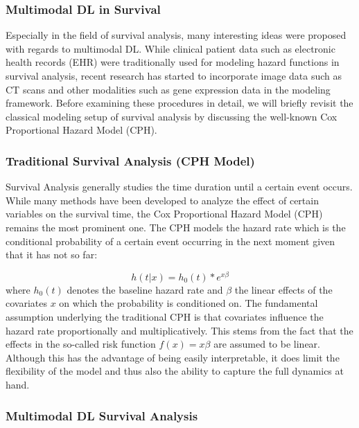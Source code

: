 \documentclass[
]{krantz}
\begin{document}
\hypertarget{multimodal-dl-in-survival}{%
\subsubsection{Multimodal DL in Survival}\label{multimodal-dl-in-survival}}

Especially in the field of survival analysis, many interesting ideas were proposed with regards to multimodal DL. While clinical patient data such as electronic health records (EHR) were traditionally used for modeling hazard functions in survival analysis, recent research has started to incorporate image data such as CT scans and other modalities such as gene expression data in the modeling framework. Before examining these procedures in detail, we will briefly revisit the classical modeling setup of survival analysis by discussing the well-known Cox Proportional Hazard Model (CPH).

\hypertarget{traditional-survival-analysis-cph-model}{%
\subsubsection{Traditional Survival Analysis (CPH Model)}\label{traditional-survival-analysis-cph-model}}

Survival Analysis generally studies the time duration until a certain event occurs. While many methods have been developed to analyze the effect
of certain variables on the survival time, the Cox Proportional Hazard Model (CPH) remains the most prominent one. The CPH models the hazard rate which is the conditional probability of a certain event occurring in the next moment given that it has not so far:

\[
h(t|x) = h_0(t) * e^{x\beta}
\]
where \(h_0(t)\) denotes the baseline hazard rate and \(\beta\) the linear effects of the covariates \(x\) on which the probability is conditioned on. The fundamental assumption underlying the traditional CPH is that covariates influence the hazard rate proportionally and multiplicatively. This stems from the fact that the effects in the so-called risk function \(f(x) = x\beta\) are assumed to be linear. Although this has the advantage of being easily interpretable, it does limit the flexibility of the model and thus also the ability to capture the full dynamics at hand.

\hypertarget{multimodal-dl-survival-analysis}{%
\subsubsection{Multimodal DL Survival Analysis}\label{multimodal-dl-survival-analysis}}
\end{document}
